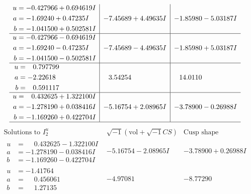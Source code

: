 \documentclass[1p]{elsarticle_modified}
\theoremstyle{definition}
\newcommand{\I}{\sqrt{-1}}
\begin{document}
$$\begin{array}{c|c|c}
\begin{aligned}
u &= -0.427966 + 0.694619 I \\
a &= -1.69240 + 0.47235 I \\
b &= -1.041500 + 0.502581 I\end{aligned}
 & -7.45689 + 4.49635 I & -1.85980 - 5.03187 I \\ \hline\begin{aligned}
u &= -0.427966 - 0.694619 I \\
a &= -1.69240 - 0.47235 I \\
b &= -1.041500 - 0.502581 I\end{aligned}
 & -7.45689 - 4.49635 I & -1.85980 + 5.03187 I \\ \hline\begin{aligned}
u &= \phantom{-}0.797799\phantom{ +0.000000I} \\
a &= -2.22618\phantom{ +0.000000I} \\
b &= \phantom{-}0.591117\phantom{ +0.000000I}\end{aligned}
 & \phantom{-}3.54254\phantom{ +0.000000I} & \phantom{-}14.0110\phantom{ +0.000000I} \\ \hline\begin{aligned}
u &= \phantom{-}0.432625 + 1.322100 I \\
a &= -1.278190 + 0.038416 I \\
b &= -1.169260 + 0.422704 I\end{aligned}
 & -5.16754 + 2.08965 I & -3.78900 - 0.26988 I\\
 \hline 
 \end{array}$$\newpage$$\begin{array}{c|c|c}  
\text{Solutions to }I^u_{2}& \I (\text{vol} + \sqrt{-1}CS) & \text{Cusp shape}\\
 \hline 
\begin{aligned}
u &= \phantom{-}0.432625 - 1.322100 I \\
a &= -1.278190 - 0.038416 I \\
b &= -1.169260 - 0.422704 I\end{aligned}
 & -5.16754 - 2.08965 I & -3.78900 + 0.26988 I \\ \hline\begin{aligned}
u &= -1.41764\phantom{ +0.000000I} \\
a &= \phantom{-}0.456061\phantom{ +0.000000I} \\
b &= \phantom{-}1.27135\phantom{ +0.000000I}\end{aligned}
 & -4.97081\phantom{ +0.000000I} & -8.77290\phantom{ +0.000000I} \\ \hline\begin{aligned}

\end{aligned}
\end{array}$$
\end{document}
